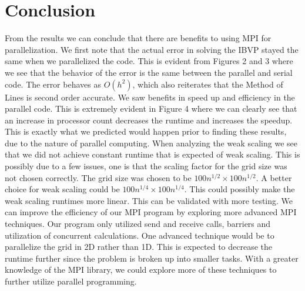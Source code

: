 \documentclass[12pt]{article}
\begin{document}
        \section{Conclusion}
From the results we can conclude that there are benefits to using MPI for parallelization. We first note that the actual error in solving the IBVP stayed the same when we parallelized the code. This is evident from Figures 2 and 3 where we see that the behavior of the error is the same between the parallel and serial code. The error behaves as $O(h^2)$, which also reiterates that the Method of Lines is second order accurate. We saw benefits in speed up and efficiency in the parallel code. This is extremely evident in Figure 4 where we can clearly see that an increase in processor count decreases the runtime and increases the speedup. This is exactly what we predicted would happen prior to finding these results, due to the nature of parallel computing. 
\newline \newline
When analyzing the weak scaling we see that we did not achieve constant runtime that is expected of weak scaling. This is possibly due to a few issues, one is that the scaling factor for the grid size was not chosen correctly. The grid size was chosen to be $100n^{1/2}\times 100n^{1/2}$. A better choice for weak scaling could be $100n^{1/4}\times 100n^{1/4}$. This could possibly make the weak scaling runtimes more linear. This can be validated with more testing. 
\newline \newline
We can improve the efficiency of our MPI program by exploring more advanced MPI techniques. Our program only utilized send and receive calls, barriers and utilization of concurrent calculations. One advanced technique would be to parallelize the grid in 2D rather than 1D. This is expected to decrease the runtime further since the problem is broken up into smaller tasks. With a greater knowledge of the MPI library, we could explore more of these techniques to further utilize parallel programming.
    
\end{document}

